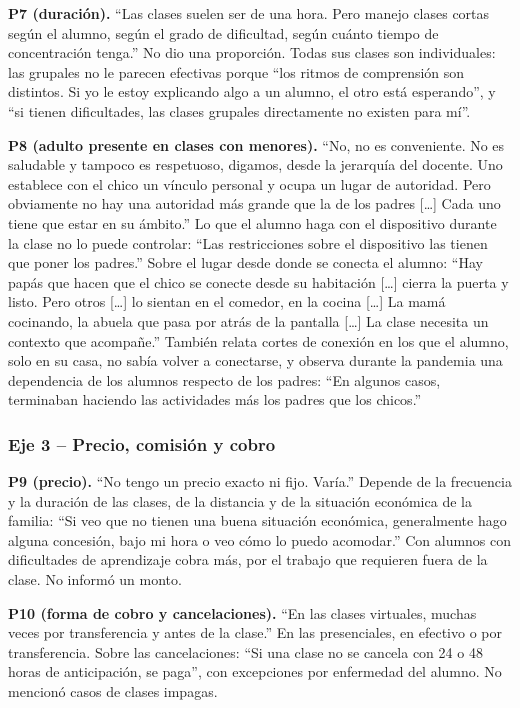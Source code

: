 \textbf{P7 (duración).} ``Las clases suelen ser de una hora. Pero manejo
clases cortas según el alumno, según el grado de dificultad, según
cuánto tiempo de concentración tenga.'' No dio una proporción. Todas sus
clases son individuales: las grupales no le parecen efectivas porque
``los ritmos de comprensión son distintos. Si yo le estoy explicando algo
a un alumno, el otro está esperando'', y ``si tienen dificultades, las
clases grupales directamente no existen para mí''.

\textbf{P8 (adulto presente en clases con menores).} ``No, no es
conveniente. No es saludable y tampoco es respetuoso, digamos, desde la
jerarquía del docente. Uno establece con el chico un vínculo personal y
ocupa un lugar de autoridad. Pero obviamente no hay una autoridad más
grande que la de los padres [\ldots] Cada uno tiene que estar en su
ámbito.'' Lo que el alumno haga con el dispositivo durante la clase no
lo puede controlar: ``Las restricciones sobre el dispositivo las tienen
que poner los padres.'' Sobre el lugar desde donde se conecta el alumno:
``Hay papás que hacen que el chico se conecte desde su habitación
[\ldots] cierra la puerta y listo. Pero otros [\ldots] lo sientan en el
comedor, en la cocina [\ldots] La mamá cocinando, la abuela que pasa por
atrás de la pantalla [\ldots] La clase necesita un contexto que
acompañe.'' También relata cortes de conexión en los que el alumno,
solo en su casa, no sabía volver a conectarse, y observa durante la
pandemia una dependencia de los alumnos respecto de los padres: ``En
algunos casos, terminaban haciendo las actividades más los padres que
los chicos.''

\subsubsection*{Eje 3 -- Precio, comisión y cobro}

\textbf{P9 (precio).} ``No tengo un precio exacto ni fijo. Varía.''
Depende de la frecuencia y la duración de las clases, de la distancia y
de la situación económica de la familia: ``Si veo que no tienen una
buena situación económica, generalmente hago alguna concesión, bajo mi
hora o veo cómo lo puedo acomodar.'' Con alumnos con dificultades de
aprendizaje cobra más, por el trabajo que requieren fuera de la clase.
No informó un monto.

\textbf{P10 (forma de cobro y cancelaciones).} ``En las clases virtuales,
muchas veces por transferencia y antes de la clase.'' En las
presenciales, en efectivo o por transferencia. Sobre las cancelaciones:
``Si una clase no se cancela con 24 o 48 horas de anticipación, se
paga'', con excepciones por enfermedad del alumno. No mencionó casos de
clases impagas.


